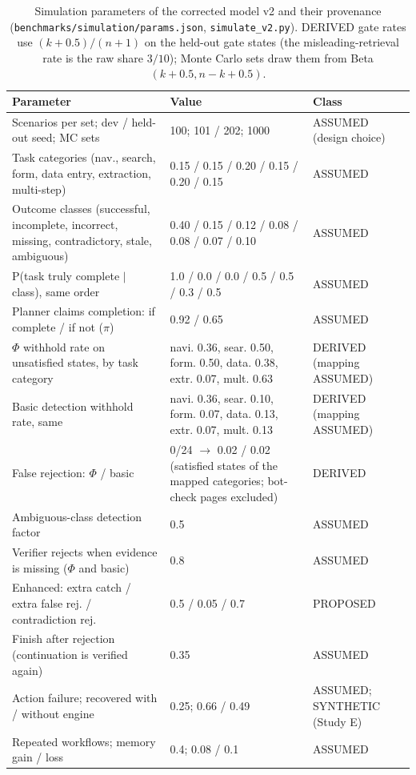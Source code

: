 \begin{table}[t]
\centering
\caption{Simulation parameters of the corrected model v2 and their provenance (\texttt{benchmarks/simulation/params.json}, \texttt{simulate\_v2.py}). DERIVED gate rates use $(k+0.5)/(n+1)$ on the held-out gate states (the misleading-retrieval rate is the raw share $3/10$); Monte Carlo sets draw them from Beta$(k+0.5, n-k+0.5)$.}
\label{tab:sim-params}
\scriptsize
\setlength{\tabcolsep}{3pt}
\begin{tabular}{@{}p{6.2cm}p{8.4cm}p{2.6cm}@{}}
\toprule
Parameter & Value & Class \\
\midrule
Scenarios per set; dev / held-out seed; MC sets & 100; 101 / 202; 1000 & ASSUMED (design choice) \\
Task categories (nav., search, form, data entry, extraction, multi-step) & 0.15 / 0.15 / 0.20 / 0.15 / 0.20 / 0.15 & ASSUMED \\
Outcome classes (successful, incomplete, incorrect, missing, contradictory, stale, ambiguous) & 0.40 / 0.15 / 0.12 / 0.08 / 0.08 / 0.07 / 0.10 & ASSUMED \\
P(task truly complete $\mid$ class), same order & 1.0 / 0.0 / 0.0 / 0.5 / 0.5 / 0.3 / 0.5 & ASSUMED \\
Planner claims completion: if complete / if not ($\pi$) & 0.92 / 0.65 & ASSUMED \\
$\Phi$ withhold rate on unsatisfied states, by task category & navi. 0.36, sear. 0.50, form. 0.50, data. 0.38, extr. 0.07, mult. 0.63 & DERIVED (mapping ASSUMED) \\
Basic detection withhold rate, same & navi. 0.36, sear. 0.10, form. 0.07, data. 0.13, extr. 0.07, mult. 0.13 & DERIVED (mapping ASSUMED) \\
False rejection: $\Phi$ / basic & 0/24 $\to$ 0.02 / 0.02 (satisfied states of the mapped categories; bot-check pages excluded) & DERIVED \\
Ambiguous-class detection factor & 0.5 & ASSUMED \\
Verifier rejects when evidence is missing ($\Phi$ and basic) & 0.8 & ASSUMED \\
Enhanced: extra catch / extra false rej. / contradiction rej. & 0.5 / 0.05 / 0.7 & PROPOSED \\
Finish after rejection (continuation is verified again) & 0.35 & ASSUMED \\
Action failure; recovered with / without engine & 0.25; 0.66 / 0.49 & ASSUMED; SYNTHETIC (Study E) \\
Repeated workflows; memory gain / loss & 0.4; 0.08 / 0.1 & ASSUMED \\

\end{tabular}
\end{table}
